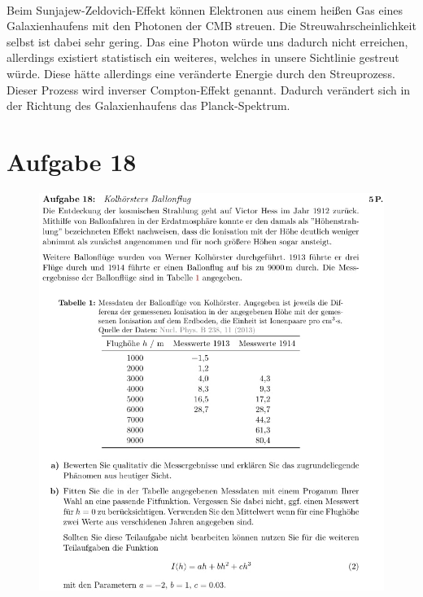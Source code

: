     \justifying\\
    Beim Sunjajew-Zeldovich-Effekt können Elektronen aus einem heißen Gas
    eines Galaxienhaufens mit den Photonen der CMB streuen.
    Die Streuwahrscheinlichkeit selbst ist dabei sehr gering. Das
    eine Photon würde uns dadurch nicht erreichen, allerdings existiert 
    statistisch ein weiteres, welches in unsere Sichtlinie
    gestreut würde. Diese hätte allerdings eine veränderte Energie
    durch den Streuprozess. Dieser Prozess wird inverser Compton-Effekt genannt.
    Dadurch verändert sich in der Richtung des Galaxienhaufens das Planck-Spektrum.



\section{Aufgabe 18}

    \begin{figure}[H]
        \centering
        \includegraphics[width=\textwidth]{images/Aufgabe18a.jpg}
        \label{fig:5}
    \end{figure}

